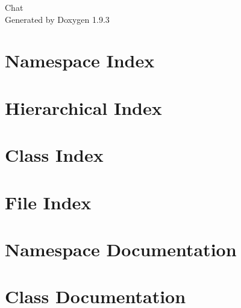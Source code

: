 \documentclass[twoside]{book}
\newcommand{\+}{\discretionary{\mbox{\scriptsize$\hookleftarrow$}}{}{}}
\newcommand{\clearemptydoublepage}{%
    \newpage{\pagestyle{empty}\cleardoublepage}%
  }
\begin{document}
  \raggedbottom
    \hypersetup{pageanchor=false,
                bookmarksnumbered=true,
                pdfencoding=unicode
               }
  \begin{titlepage}
  \vspace*{7cm}
  \begin{center}%
  {\Large Chat}\\
  \vspace*{1cm}
  {\large Generated by Doxygen 1.9.3}\\
  \end{center}
  \end{titlepage}
  \clearemptydoublepage
  \tableofcontents
  \clearemptydoublepage
  \hypersetup{pageanchor=true}
\chapter{Namespace Index}

\chapter{Hierarchical Index}

\chapter{Class Index}

\chapter{File Index}

\chapter{Namespace Documentation}

\chapter{Class Documentation}






























\end{document}
